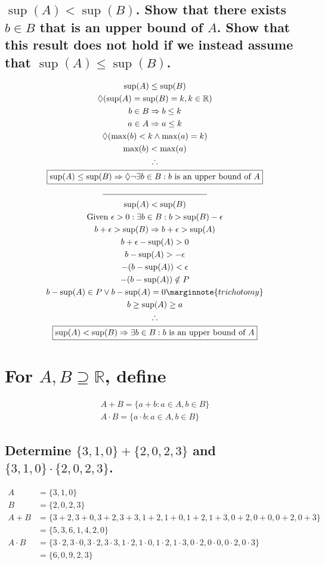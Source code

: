 \documentclass[letterpaper]{article}
\begin{document}
\subsection{$\sup(A)<\sup(B)$. Show that there exists $b\in B$ that is an upper bound of $A$. Show that this result does not hold if we instead assume that $\sup(A)\leq\sup(B)$.}
\begin{gather*}
\sup(A)\leq\sup(B) \\
\Diamond(\sup(A)=\sup(B)=k,k\in\mathbb{R}) \\
b\in B \Rightarrow b\leq k \\
a\in A \Rightarrow a\leq k \\
\Diamond(\max(b)<k\land \max(a)=k) \\
\max(b)<\max(a) \\
\therefore \\
\boxed{\sup(A)\leq\sup(B) \Rightarrow \Diamond\neg\exists b\in B:b\text{ is an upper bound of }A} \\
\line(1, 0){125} \\
\sup(A)<\sup(B) \\
\text{Given }\epsilon>0:\exists b\in B:b>\sup(B)-\epsilon \\
b+\epsilon>\sup(B) \Rightarrow b+\epsilon>\sup(A) \\
b+\epsilon-\sup(A)>0 \\
b-\sup(A)>-\epsilon \\
-(b-\sup(A))<\epsilon \\
-(b-\sup(A))\notin P \\
b-\sup(A)\in P \lor b-\sup(A)=0 \marginnote{trichotomy} \\
b\geq\sup(A)\geq a\\
\therefore \\
\boxed{\sup(A)<\sup(B) \Rightarrow \exists b\in B:b\text{ is an upper bound of }A}
\end{gather*}

\section{For $A,B\supseteq \mathbb{R}$, define}
\begin{gather*}
A+B=\{a+b:a\in A,b\in B\} \\
A\cdot B=\{a\cdot b:a\in A,b\in B\}
\end{gather*}
\subsection{Determine $\{3,1,0\}+\{2,0,2,3\}$ and $\{3,1,0\}\cdot\{2,0,2,3\}$.}
\begin{align*}
A&=\{3,1,0\} \\
B&=\{2,0,2,3\} \\
A+B&=\{3+2,3+0,3+2,3+3,1+2,1+0,1+2,1+3,0+2,0+0,0+2,0+3\} \\
&=\{5,3,6,1,4,2,0\} \\
A\cdot B&= \{3\cdot 2,3\cdot 0,3\cdot 2,3\cdot 3,1\cdot 2,1\cdot 0,1\cdot 2,1\cdot 3,0\cdot 2,0\cdot 0,0\cdot 2,0\cdot 3\} \\
&=\{6,0,9,2,3\}
\end{align*}
\end{document}
